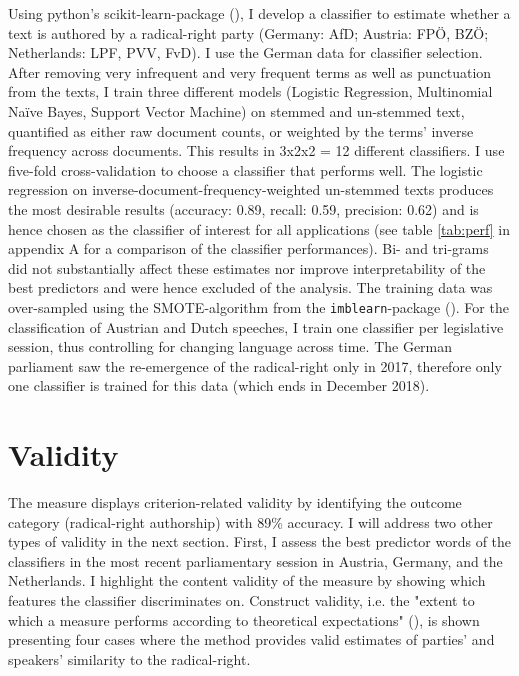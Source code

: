 \documentclass{article}
\begin{document}
Using python’s scikit-learn-package (\cite{Pedregosa2011}), I develop a classifier to estimate whether a text is authored by a radical-right party (Germany: AfD; Austria: FPÖ, BZÖ; Netherlands: LPF, PVV, FvD). I use the German data for classifier selection. After removing very infrequent and very frequent terms as well as punctuation from the texts, I train three different models (Logistic Regression, Multinomial Naïve Bayes, Support Vector Machine) on stemmed and un-stemmed text, quantified as either raw document counts, or weighted by the terms' inverse frequency across documents. This results in 3x2x2 = 12 different classifiers. I use five-fold cross-validation to choose a classifier that performs well. The logistic regression on inverse-document-frequency-weighted un-stemmed texts produces the most desirable results (accuracy: 0.89, recall: 0.59, precision: 0.62) and is hence chosen as the classifier of interest for all applications (see table \ref{tab:perf} in appendix A for a comparison of the classifier performances). Bi- and tri-grams did not substantially affect these estimates nor improve interpretability of the best predictors and were hence excluded of the analysis. The training data was over-sampled using the SMOTE-algorithm from the \texttt{imblearn}-package (\cite{Lemaitre2017}). For the classification of Austrian and Dutch speeches, I train one classifier per legislative session, thus controlling for changing language across time. The German parliament saw the re-emergence of the radical-right only in 2017, therefore only one classifier is trained for this data (which ends in December 2018). \par


\section{Validity}
The measure displays criterion-related validity by identifying the outcome category (radical-right authorship) with 89\% accuracy. I will address two other types of validity in the next section. First, I assess the best predictor words of the classifiers in the most recent parliamentary session in Austria, Germany, and the Netherlands. I highlight the content validity of the measure by showing which features the classifier discriminates on. Construct validity, i.e. the "extent to which a measure performs according to theoretical expectations" (\cite{Carmines2004Validity}), is shown presenting four cases where the method provides valid estimates of parties' and speakers' similarity to the radical-right. \par
\end{document}
